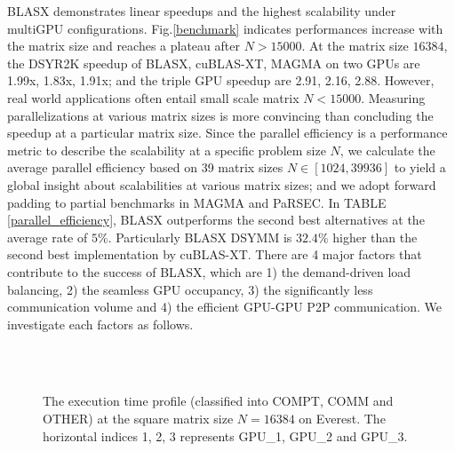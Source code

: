 \documentclass[conference]{IEEEtran}
\begin{document}
BLASX demonstrates linear speedups and the highest scalability under multiGPU configurations.
Fig.\ref{benchmark} indicates performances increase with the matrix size and reaches a plateau 
after $N > 15000$. At the matrix size $16384$, the DSYR2K speedup of 
BLASX, cuBLAS-XT, MAGMA on two GPUs are 1.99x, 1.83x, 1.91x; and the triple GPU speedup are 
2.91, 2.16, 2.88. However, real world applications often entail small scale matrix
$N < 15000$. Measuring parallelizations at various matrix sizes is more convincing than
concluding the speedup at a particular matrix size. Since the parallel efficiency is a 
performance metric to describe the scalability at a specific problem size $N$,
we calculate the average parallel efficiency based on 39 matrix sizes $N \in [1024, 39936]$ 
to yield a global insight about scalabilities at various matrix sizes; and we adopt forward
padding to partial benchmarks in MAGMA and PaRSEC. In TABLE \ref{parallel_efficiency}, 
BLASX outperforms the second 
best alternatives at the average rate of $5\%$. Particularly BLASX DSYMM is $32.4\%$ 
higher than the second best implementation by cuBLAS-XT. There are 4 major factors that contribute
to the success of BLASX, which are 1) the demand-driven load balancing, 2) the seamless 
GPU occupancy, 3) the significantly less communication volume and 4) the efficient GPU-GPU 
P2P communication. We investigate each factors as follows.

\begin{figure}[!t]
\centering
{}
\hfil
{}
\\
\hfil
{}
\\
\hfil
{}
\caption{The execution time profile (classified into COMPT, COMM and OTHER) at the square matrix size $N = 16384$ on Everest. 
The horizontal indices 1, 2, 3 represents GPU\_1, GPU\_2 and GPU\_3.}
\label{time_profile}
\vspace{-0.3in}
\end{figure}
\end{document}
